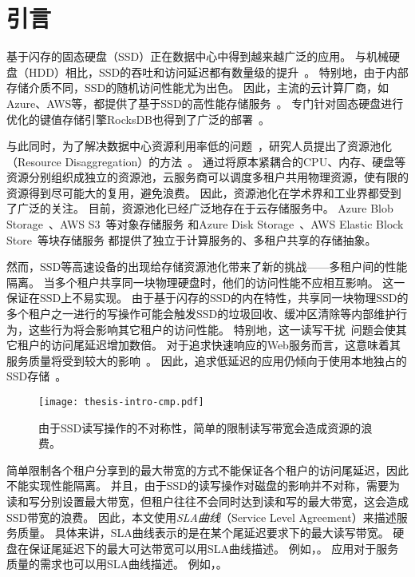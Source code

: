 
\chapter{引言}
\label{chap:intro}

基于闪存的固态硬盘（SSD）正在数据中心中得到越来越广泛的应用。
与机械硬盘（HDD）相比，SSD的吞吐和访问延迟都有数量级的提升~\cite{chen2009understanding}。
特别地，由于内部存储介质不同，SSD的随机访问性能尤为出色。
因此，主流的云计算厂商，如Azure、AWS等，都提供了基于SSD的高性能存储服务~\cite{awsebs,azuredisks}。
专门针对固态硬盘进行优化的键值存储引擎RocksDB也得到了广泛的部署~\cite{cao2020characterizing,rocksdb,siying2021rocksdb}。

与此同时，为了解决数据中心资源利用率低的问题~\cite{kanev2015profiling}，研究人员提出了资源池化（Resource Disaggregation）的方法~\cite{shan2018legoos,klimovic2016flash}。
通过将原本紧耦合的CPU、内存、硬盘等资源分别组织成独立的资源池，云服务商可以调度多租户共用物理资源，使有限的资源得到尽可能大的复用，避免浪费。
因此，资源池化在学术界和工业界都受到了广泛的关注。
目前，资源池化已经广泛地存在于云存储服务中。
Azure Blob Storage~\cite{azureblob}、AWS S3~\cite{awss3}等对象存储服务
和Azure Disk Storage~\cite{azuredisks}、AWS Elastic Block Store~\cite{awsebs}等块存储服务
都提供了独立于计算服务的、多租户共享的存储抽象。

然而，SSD等高速设备的出现给存储资源池化带来了新的挑战——多租户间的性能隔离。
当多个租户共享同一块物理硬盘时，他们的访问性能不应相互影响。
这一保证在SSD上不易实现。
由于基于闪存的SSD的内在特性，共享同一块物理SSD的多个租户之一进行的写操作可能会触发SSD的垃圾回收、缓冲区清除等内部维护行为，这些行为将会影响其它租户的访问性能。
特别地，这一读写干扰~\cite{klimovic2017reflex}问题会使其它租户的访问尾延迟增加数倍。
对于追求快速响应的Web服务而言，这意味着其服务质量将受到较大的影响~\cite{dean2013tail}。
因此，追求低延迟的应用仍倾向于使用本地独占的SSD存储~\cite{awsvm,azurevm}。

\begin{figure}[h]
  \centering
  \texttt{[image: thesis-intro-cmp.pdf]}
  \caption{
        由于SSD读写操作的不对称性，简单的限制读写带宽会造成资源的浪费。
      }
  \label{fig:intro}
\end{figure}

简单限制各个租户分享到的最大带宽的方式不能保证各个租户的访问尾延迟，因此不能实现性能隔离。
并且，由于SSD的读写操作对磁盘的影响并不对称，需要为读和写分别设置最大带宽，但租户往往不会同时达到读和写的最大带宽，这会造成SSD带宽的浪费。
因此，本文使用\textit{SLA曲线}（Service Level Agreement）来描述服务质量。
具体来讲，SLA曲线表示的是在某个尾延迟要求下的最大读写带宽。
硬盘在保证尾延迟下的最大可达带宽可以用SLA曲线描述。
例如，。
应用对于服务质量的需求也可以用SLA曲线描述。
例如，。

